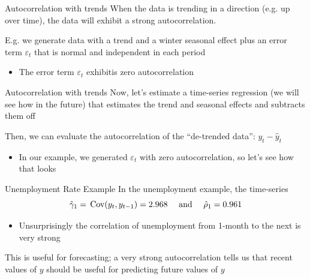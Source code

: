 \documentclass[aspectratio=169,t,11pt,table]{beamer}
\begin{document}

\begin{frame}{Autocorrelation with trends}
  When the data is trending in a direction (e.g. up over time), the data will exhibit a strong autocorrelation.

  \bigskip
  E.g. we generate data with a trend and a winter seasonal effect plus an error term $\varepsilon_t$ that is normal and independent in each period
  \begin{itemize}
    \item The error term $\varepsilon_t$ exhibitis zero autocorrelation
  \end{itemize}
\end{frame}


\begin{frame}{Autocorrelation with trends}
  Now, let's estimate a time-series regression (we will see how in the future) that estimates the trend and seasonal effects and subtracts them off

  \bigskip
  Then, we can evaluate the autocorrelation of the ``de-trended data'': $y_t - \hat{y}_t$
  \begin{itemize}
    \item In our example, we generated $\varepsilon_t$ with zero autocorrelation, so let's see how that looks
  \end{itemize}
\end{frame}


\begin{frame}{Unemployment Rate Example}
  In the unemployment example, the time-series 
  $$
    \hat{\gamma}_1 = \cov{y_t, y_{t-1}} = 2.968 \quad \text{ and } \quad \hat{\rho}_1 = 0.961
  $$
  \begin{itemize}
    \item Unsurprisingly the correlation of unemployment from 1-month to the next is very strong
  \end{itemize}

  \pause
  \bigskip
  This is useful for forecasting; a very strong autocorrelation tells us that recent values of $y$ should be useful for predicting future values of $y$
\end{frame}
\end{document}
